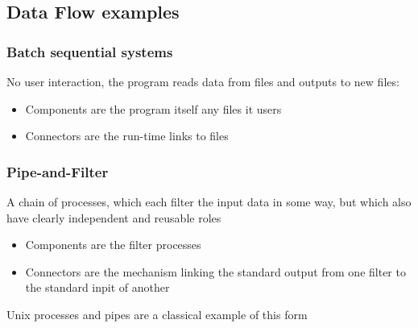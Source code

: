 \documentclass{article}[18pt]
\begin{document}
\subsection{Data Flow examples}
\subsubsection{Batch sequential systems}
No user interaction, the program reads data from files and outputs to new files:
\begin{itemize}
	\item Components are the program itself any files it users
	\item Connectors are the run-time links to files
\end{itemize}
\subsubsection{Pipe-and-Filter}
A chain of processes, which each filter the input data in some way, but which also have clearly independent and reusable roles
\begin{itemize}
	\item Components are the filter processes
	\item Connectors are the mechanism linking the standard output from one filter to the standard inpit of another
\end{itemize}
Unix processes and pipes are a classical example of this form
\end{document}
